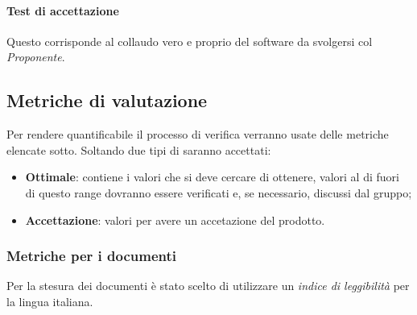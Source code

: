 \documentclass{scalatekids-article}
\begin{document}
\paragraph{Test di accettazione}
Questo corrisponde al collaudo vero e proprio del software da svolgersi col \textit{Proponente}.

\subsection{Metriche di valutazione}
Per rendere quantificabile il processo di verifica verranno usate delle metriche elencate sotto. Soltando due tipi di  saranno accettati:
\begin{itemize}
  \item \textbf{Ottimale}: contiene i valori che si deve cercare di ottenere, valori al di fuori di questo range dovranno essere verificati e, se necessario, discussi dal gruppo;
  \item \textbf{Accettazione}: valori per avere un accetazione del prodotto.
\end{itemize}
\subsubsection{Metriche per i documenti}
Per la stesura dei documenti è stato scelto di utilizzare un \textit{indice di leggibilità} per la lingua italiana.
\end{document}
